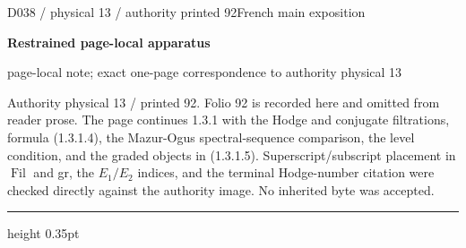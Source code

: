 \documentclass[9pt]{article}
\newcommand{\CanonText}[1]{\par{\fontsize{8.0}{9.35}\selectfont\RaggedRight #1\par}\vspace{2.2pt}}
\newcommand{\LayerTitle}{Restrained page-local apparatus}
\begin{document}
\noindent\begin{minipage}[t][\dimexpr\textheight-5pt\relax][t]{\textwidth}
{\sffamily\fontsize{7.3}{8.2}\selectfont\color{Quiet} D038 / physical 13 / authority printed 92\hfill French main exposition}
\par{}\vspace{4.5pt}
{\sffamily\fontsize{10.4}{11.6}\selectfont\bfseries\color{Accent} \LayerTitle}
\par{\sffamily\fontsize{6.7}{7.7}\selectfont\color{Quiet} page-local note; exact one-page correspondence to authority physical 13}
\vspace{5pt}
\CanonText{Authority physical 13 / printed 92. Folio 92 is recorded here and omitted from reader prose. The page continues 1.3.1 with the Hodge and conjugate filtrations, formula (1.3.1.4), the Mazur-Ogus spectral-sequence comparison, the level condition, and the graded objects in (1.3.1.5). Superscript/subscript placement in \(\operatorname{Fil}\) and gr, the \(E_{1}/E_{2}\) indices, and the terminal Hodge-number citation were checked directly against the authority image. No inherited byte was accepted.}
\vfill
{\color{Accent}\hrule height 0.35pt}\vspace{3pt}
\end{minipage}
\newpage
\end{document}
